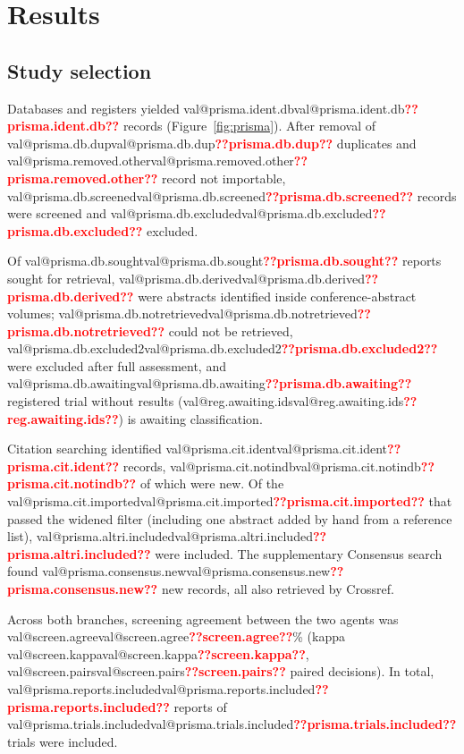 \documentclass[11pt,a4paper]{article}
\makeatletter
\newcommand{\val}[1]{\ifcsname val@#1\endcsname\csname val@#1\endcsname\else\textbf{\textcolor{red}{??#1??}}\fi}
\makeatother
\begin{document}
\section{Results}

\subsection{Study selection}
Databases and registers yielded \val{prisma.ident.db} records (Figure~\ref{fig:prisma}). After removal of \val{prisma.db.dup} duplicates and \val{prisma.removed.other} record not importable, \val{prisma.db.screened} records were screened and \val{prisma.db.excluded} excluded.

Of \val{prisma.db.sought} reports sought for retrieval, \val{prisma.db.derived} were abstracts identified inside conference-abstract volumes; \val{prisma.db.notretrieved} could not be retrieved, \val{prisma.db.excluded2} were excluded after full assessment, and \val{prisma.db.awaiting} registered trial without results (\val{reg.awaiting.ids}) is awaiting classification.

Citation searching identified \val{prisma.cit.ident} records, \val{prisma.cit.notindb} of which were new. Of the \val{prisma.cit.imported} that passed the widened filter (including one abstract added by hand from a reference list), \val{prisma.altri.included} were included. The supplementary Consensus search found \val{prisma.consensus.new} new records, all also retrieved by Crossref.

Across both branches, screening agreement between the two agents was \val{screen.agree}\% (kappa \val{screen.kappa}, \val{screen.pairs} paired decisions). In total, \val{prisma.reports.included} reports of \val{prisma.trials.included} trials were included.
\end{document}
